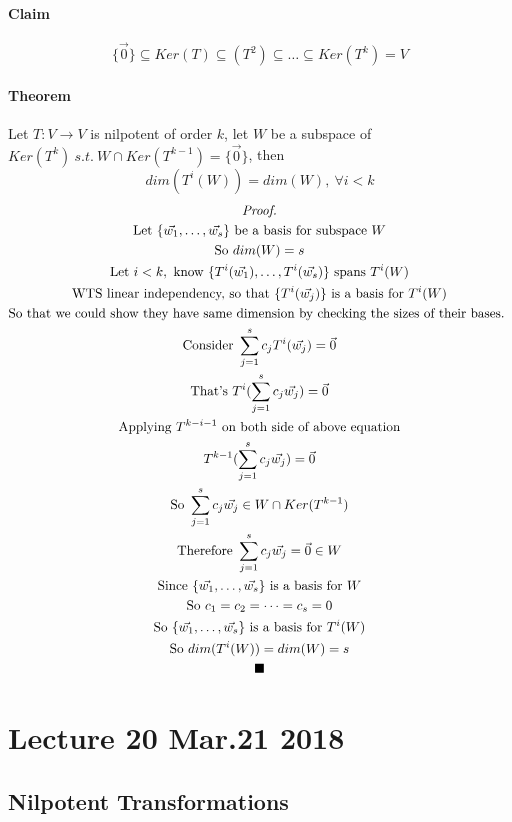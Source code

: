 \documentclass[11pt]{article}
\newcommand{\trans}[3]{{#1}: {#2} \to {#3}}
\newcommand{\vset}[3]{\{\vec{{#1}_{#2}}, \dots, \vec{{#1}_{#3}}\}}
\newcommand{\theorem}[0]{\paragraph{Theorem}}
\newcommand{\tx}[1]{\text{{#1}}}
\begin{document}
	\paragraph{Claim} 
	\[
		\{\vec{0}\} \subseteq Ker(T) \subseteq (T^2) \subseteq \dots \subseteq Ker(T^k) = V
	\]
	
	\theorem Let $\trans{T}{V}{V}$ is nilpotent of order $k$, let $W$ be a subspace of $Ker(T^k)\ s.t.\ W \cap Ker(T^{k-1}) = \{\vec{0}\}$, then
	\[
		dim(T^i(W)) = dim(W),\ \forall i < k
	\]
	\begin{multline*}
		\emph{Proof.} \\ 
		\tx{Let } \vset{w}{1}{s} \tx{ be a basis for subspace }W \\
		\tx{So } dim(W) = s \\
		\tx{Let } i < k, \tx{ know } \{T^i(\vec{w_1}),\dots,T^i(\vec{w_s})\} \tx{ spans }T^i(W) \\
		\tx{WTS linear independency, so that } \{T^i(\vec{w_j})\}\tx{ is a basis for }T^i(W) \\
		\tx{So that we could show they have same dimension by checking the sizes of their bases. }\\
		\tx{Consider } \sum_{j=1}^{s}{c_j T^i(\vec{w_j})} = \vec{0} \\
		\tx{That's } T^i(\sum_{j=1}^{s}{c_j \vec{w_j}}) = \vec{0} \\
		\tx{Applying } T^{k-i-1} \tx{ on both side of above equation} \\
		T^{k-1}(\sum_{j=1}^{s}{c_j \vec{w_j}}) = \vec{0} \\
		\tx{So } \sum_{j=1}^{s}{c_j \vec{w_j}} \in W \cap Ker(T^{k-1}) \\
		\tx{Therefore } \sum_{j=1}^{s}{c_j \vec{w_j}} = \vec{0} \in W\\
		\tx{Since } \vset{w}{1}{s} \tx{ is a basis for } W \\
		\tx{So } c_1 = c_2 = \dots = c_s = 0 \\
		\tx{So } \vset{w}{1}{s} \tx{ is a basis for }T^i(W) \\
		\tx{So } dim(T^i(W)) = dim(W) = s \\
		\blacksquare
	\end{multline*}
	
	\section{Lecture 20 Mar.21 2018}
	\subsection{Nilpotent Transformations}
\end{document}
